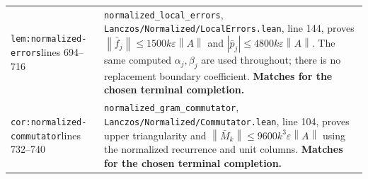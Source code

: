 \documentclass[10pt,a4paper]{article}
\newcommand{\code}[1]{{\small\nolinkurl{#1}}}
\newcommand{\norm}[1]{\left\lVert#1\right\rVert}
\newcommand{\eps}{\varepsilon}
\newcommand{\loc}[2]{\code{#1}, line #2}
\begin{document}
\begin{longtable}{@{}p{44mm}p{121.7mm}@{}}
\code{lem:normalized-errors}\newline lines 694--716 &
\code{normalized_local_errors},
\loc{Lanczos/Normalized/LocalErrors.lean}{144}, proves
$\norm{\bar f_j}\le1500k\eps\norm A$ and
$|\bar p_j|\le4800k\eps\norm A$.
The same computed $\alpha_j,\beta_j$ are used throughout; there is no
replacement boundary coefficient. \textbf{Matches for the chosen terminal
completion.}\\\addlinespace

\code{cor:normalized-commutator}\newline lines 732--740 &
\code{normalized_gram_commutator},
\loc{Lanczos/Normalized/Commutator.lean}{104}, proves upper triangularity and
$\norm{\bar M_k}\le9600k^3\eps\norm A$ using the normalized recurrence and
unit columns. \textbf{Matches for the chosen terminal completion.}\\
\bottomrule
\end{longtable}
\end{document}
